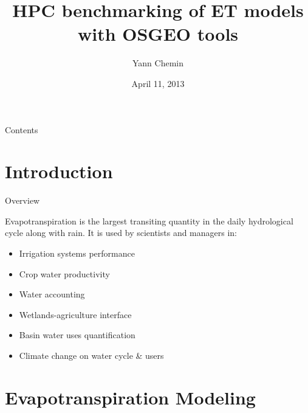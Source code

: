 \documentclass[xcolor=dvipsnames,beamer]{beamer} %
\title[HPC benchmarking ET models OSGEO]
{HPC benchmarking of ET models with OSGEO tools}
\author[Yann Chemin]
{Yann Chemin}
\institute[IWMI]
{International Water Management Institute\\
\vspace{20pt}
}
\date{April 11, 2013}
\begin{document}
\frame{
\titlepage
}
\begin{frame}{Contents}
\tableofcontents
\end{frame}

\section{Introduction}
\begin{frame}[fragile]{Overview}

Evapotranspiration is the largest transiting quantity in the daily 
hydrological cycle along with rain. It is used by scientists and
managers in:
\newline\linebreak

\begin{itemize}
 \item Irrigation systems performance
 \item Crop water productivity
 \item Water accounting
 \item Wetlands-agriculture interface
 \item Basin water uses quantification
 \item Climate change on water cycle \& users
\end{itemize}


\end{frame}

\section{Evapotranspiration Modeling}
\end{document}
